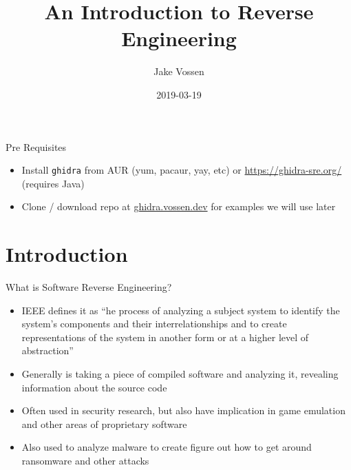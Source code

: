 \documentclass{beamer}
\title[Ghidra]{An Introduction to Reverse Engineering}
\author{Jake Vossen}
\institute{Colorado School of Mines - oresec}
\date{2019-03-19}
\begin{document}
\begin{frame}{Pre Requisites}
  \begin{itemize}
    \item Install \texttt{ghidra} from AUR (yum, pacaur, yay, etc) or
      \url{https://ghidra-sre.org/} (requires Java)
    \item Clone / download repo at \url{ghidra.vossen.dev} for
      examples we will use later
    \end{itemize}
\end{frame}
\begin{frame}
  \titlepage
\end{frame}


\section{Introduction}

\begin{frame}{What is Software Reverse Engineering?}

\begin{itemize}
  \item IEEE defines it as ``he process of analyzing a subject system to identify the system's components and their interrelationships and to create representations of the system in another form or at a higher level of abstraction''
  \item Generally is taking a piece of compiled software and analyzing
    it, revealing information about the source code
  \item Often used in security research, but also have implication in
    game emulation and other areas of proprietary software
  \item Also used to analyze malware to create figure out how to get
    around ransomware and other attacks
\end{itemize}

\vskip 1cm

\end{frame}
\end{document}
